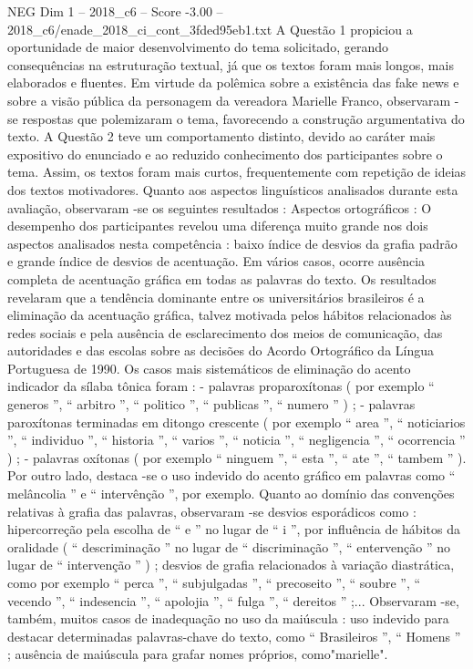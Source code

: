 \begin{textsample}{NEG Dim 1 – 2018\_c6 – Score -3.00 – 2018\_c6/enade\_2018\_ci\_cont\_3fded95eb1.txt}
A Questão 1 propiciou a oportunidade de maior desenvolvimento do tema solicitado, gerando consequências na estruturação textual, já que os textos foram mais longos, mais elaborados e fluentes.
Em virtude da polêmica sobre a existência das fake news e sobre a visão pública da personagem da vereadora Marielle Franco, observaram -se respostas que polemizaram o tema, favorecendo a construção argumentativa do texto.
A Questão 2 teve um comportamento distinto, devido ao caráter mais expositivo do enunciado e ao reduzido conhecimento dos participantes sobre o tema.
Assim, os textos foram mais curtos, frequentemente com repetição de ideias dos textos motivadores.
Quanto aos aspectos linguísticos analisados durante esta avaliação, observaram -se os seguintes resultados : Aspectos ortográficos : O desempenho dos participantes revelou uma diferença muito grande nos dois aspectos analisados nesta competência : baixo índice de desvios da grafia padrão e grande índice de desvios de acentuação.
Em vários casos, ocorre ausência completa de acentuação gráfica em todas as palavras do texto.
Os resultados revelaram que a tendência dominante entre os universitários brasileiros é a eliminação da acentuação gráfica, talvez motivada pelos hábitos relacionados às redes sociais e pela ausência de esclarecimento dos meios de comunicação, das autoridades e das escolas sobre as decisões do Acordo Ortográfico da Língua Portuguesa de 1990.
Os casos mais sistemáticos de eliminação do acento indicador da sílaba tônica foram : - palavras proparoxítonas ( por exemplo “ generos ”, “ arbitro ”, “ politico ”, “ publicas ”, “ numero ” ) ; - palavras paroxítonas terminadas em ditongo crescente ( por exemplo “ area ”, “ noticiarios ”, “ individuo ”, “ historia ”, “ varios ”, “ noticia ”, “ negligencia ”, “ ocorrencia ” ) ; - palavras oxítonas ( por exemplo “ ninguem ”, “ esta ”, “ ate ”, “ tambem ” ).
Por outro lado, destaca -se o uso indevido do acento gráfico em palavras como “ melâncolia ” e “ intervênção ”, por exemplo.
Quanto ao domínio das convenções relativas à grafia das palavras, observaram -se desvios esporádicos como : hipercorreção pela escolha de “ e ” no lugar de “ i ”, por influência de hábitos da oralidade ( “ descriminação ” no lugar de “ discriminação ”, “ entervenção ” no lugar de “ intervenção ” ) ; desvios de grafia relacionados à variação diastrática, como por exemplo “ perca ”, “ subjulgadas ”, “ precoseito ”, “ soubre ”, “ vecendo ”, “ indesencia ”, “ apolojia ”, “ fulga ”, “ dereitos ” ;...
Observaram -se, também, muitos casos de inadequação no uso da maiúscula : uso indevido para destacar determinadas palavras-chave do texto, como “ Brasileiros ”, “ Homens ” ; ausência de maiúscula para grafar nomes próprios, como"marielle".

\end{textsample}

